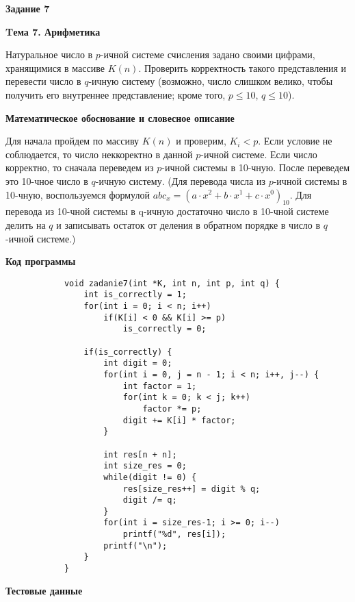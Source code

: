 \documentclass[12pt, a4paper]{article}
\begin{document}
		\begin{flushleft}
			\newpage
			{\textbf{Задание 7}}\par
			{\textbf{Tема 7. Арифметика}}\par
			{Натуральное число в $p$-ичной системе счисления задано своими
			цифрами, хранящимися в массиве $K(n)$. Проверить корректность такого 
			представления и перевести число в $q$-ичную систему (возможно,
			число слишком велико, чтобы получить его внутреннее представление;
			кроме того, $p\leq 10$, $q\leq 10$).}\par
			{\textbf{Математическое обоснование и словесное описание}\par
			Для начала пройдем по массиву $K(n)$ и проверим, $K_i<p$. Если условие не
			соблюдается, то число неккоректно в данной $p$-ичной системе.
			Если число корректно, то сначала переведем из $p$-ичной системы в 10-чную.
			После переведем это 10-чное число в $q$-ичную систему. (Для перевода числа из $p$-ичной
			системы в 10-чную, воспользуемся формулой $abc_x=(a\cdot x^2+b\cdot x^1+c\cdot x^0)_{10}$.
			Для перевода из 10-чной системы в q-ичную достаточно число в 10-чной системе делить на $q$ и 
			записывать остаток от деления в обратном порядке в число в $q$-ичной системе.)
			}\par

		\end{flushleft}
		\newpage
		{\textbf{Код программы}}\par
		\begin{verbatim}
			void zadanie7(int *K, int n, int p, int q) {
				int is_correctly = 1;
				for(int i = 0; i < n; i++)
					if(K[i] < 0 && K[i] >= p)
						is_correctly = 0;

				if(is_correctly) {
					int digit = 0;
					for(int i = 0, j = n - 1; i < n; i++, j--) {
						int factor = 1;
						for(int k = 0; k < j; k++)
							factor *= p;
						digit += K[i] * factor;
					}

					int res[n + n];
					int size_res = 0;
					while(digit != 0) {
						res[size_res++] = digit % q;
						digit /= q;
					}
					for(int i = size_res-1; i >= 0; i--)
						printf("%d", res[i]);
					printf("\n");
				}
			}
		\end{verbatim}

		{\textbf{Тестовые данные}\par

		}
\end{document}
